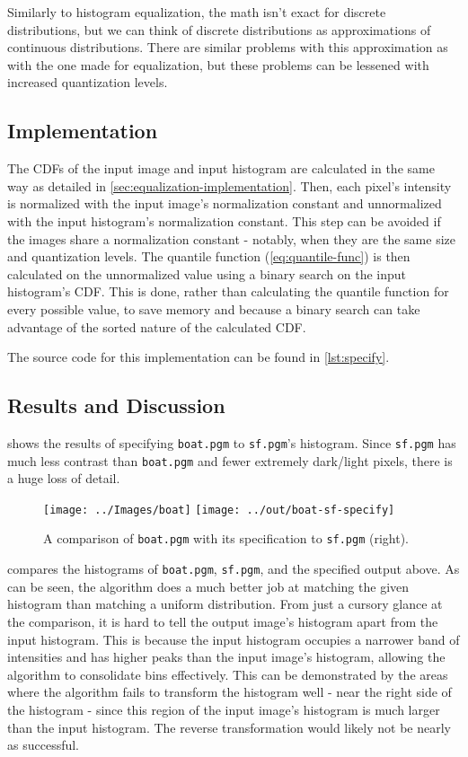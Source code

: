\documentclass[headings=optiontoheadandtoc,listof=totoc,parskip=full]{scrartcl}
\begin{document}
Similarly to histogram equalization, the math isn't exact for discrete distributions, but we can think of discrete distributions as approximations of continuous distributions. There are similar problems with this approximation as with the one made for equalization, but these problems can be lessened with increased quantization levels.

\subsection{Implementation}

The CDFs of the input image and input histogram are calculated in the same way as detailed in \cref{sec:equalization-implementation}. Then, each pixel's intensity is normalized with the input image's normalization constant and unnormalized with the input histogram's normalization constant. This step can be avoided if the images share a normalization constant - notably, when they are the same size and quantization levels. The quantile function (\cref{eq:quantile-func}) is then calculated on the unnormalized value using a binary search on the input histogram's CDF. This is done, rather than calculating the quantile function for every possible value, to save memory and because a binary search can take advantage of the sorted nature of the calculated CDF.

The source code for this implementation can be found in \cref{lst:specify}.

\subsection{Results and Discussion}
\label{sec:specification-results}

 shows the results of specifying \texttt{boat.pgm} to \texttt{sf.pgm}'s histogram. Since \texttt{sf.pgm} has much less contrast than \texttt{boat.pgm} and fewer extremely dark/light pixels, there is a huge loss of detail.

\begin{figure}[H]
	\centering
	\texttt{[image: ../Images/boat]}
	\texttt{[image: ../out/boat-sf-specify]}
	\caption{A comparison of \texttt{boat.pgm} with its specification to \texttt{sf.pgm} (right).}
	\label{fig:specify-result-1}
\end{figure}

 compares the histograms of \texttt{boat.pgm}, \texttt{sf.pgm}, and the specified output above. As can be seen, the algorithm does a much better job at matching the given histogram than matching a uniform distribution. From just a cursory glance at the comparison, it is hard to tell the output image's histogram apart from the input histogram. This is because the input histogram occupies a narrower band of intensities and has higher peaks than the input image's histogram, allowing the algorithm to consolidate bins effectively. This can be demonstrated by the areas where the algorithm fails to transform the histogram well - near the right side of the histogram - since this region of the input image's histogram is much larger than the input histogram. The reverse transformation would likely not be nearly as successful.
\end{document}
